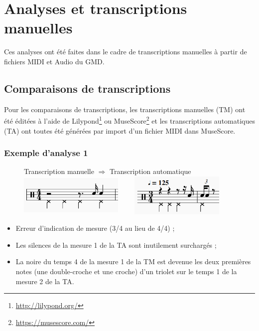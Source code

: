 \section{Analyses et transcriptions manuelles}
\label{analyse_midi_audio}
Ces analyses ont été faites dans le cadre de transcriptions manuelles à partir
de fichiers MIDI et Audio du GMD.

\subsection*{Comparaisons de transcriptions}
Pour les comparaisons de transcriptions, les transcriptions manuelles (TM) ont
été éditées à l’aide de Lilypond\footnote{\url{http://lilypond.org/}} ou
MuseScore\footnote{\url{https://musescore.com/}} et les transcriptions
automatiques (TA) ont toutes été générées par import d’un fichier MIDI dans
MuseScore.

\subsubsection{Exemple d’analyse 1}
\begin{figure}[h]
\centering
Transcription manuelle $\Rightarrow$ Transcription automatique
\includegraphics[height=20mm, width=50mm]{
z_images/4_experimentations/1_analyses/0_drummer1_session3/1_manuelle.png}
\ \ \ \ 
\includegraphics[height=20mm, width=45mm]{
z_images/4_experimentations/1_analyses/0_drummer1_session3/0_musescore.png}
\end{figure}
\begin{itemize}
	\item Erreur d’indication de mesure (3/4 au lieu de 4/4) ;
	\item Les silences de la mesure 1 de la TA sont inutilement surchargés ;
	\item La noire du temps 4 de la mesure 1 de la TM est devenue les deux
        premières notes (une double-croche et une croche) d’un triolet sur le
        temps 1 de la mesure 2 de la TA.
\end{itemize}

